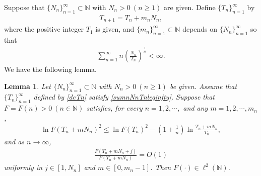 \documentclass[12pt]{amsart}
\theoremstyle{plain}
\newtheorem{lemma}[theorem]{Lemma}
\theoremstyle{definition}
\begin{document}
	Suppose that $\{N_n\}_{n=1}^\infty\subset\mathbb{N}$ with $N_n>0\ (n\geq 1)$ are given. Define $\{T_n\}_{n=1}^\infty$ by 
\begin{align}
T_{n+1}=T_n+m_nN_n,\label{deTn}
\end{align}
where the positive integer $T_1$ is given, and $\{m_n\}_{n=1}^\infty\subset \mathbb{N}$ depends on $\{N_n\}_{n=1}^{\infty}$ so that
\begin{align}
\sum_{n=1}^{\infty}n\left(\frac{N_n}{T_n}\right)^{\frac{1}{n}}<\infty.\label{sumnNnTnleqinfty}
\end{align}
We have the following lemma.
\begin{lemma}\label{lemmabasiccritical} Let $\{N_n\}_{n=1}^\infty\subset\mathbb{N}$ with $N_n>0\ (n\geq 1)$ be given. Assume that $\{T_n\}_{n=1}^\infty$ defined by \eqref{deTn} satisfy \eqref{sumnNnTnleqinfty}.
		Suppose that $F=F(n)>0\ (n\in\mathbb{N})$
satisfies, for every $n=1,2,\cdots,$ and  any $m=1,2,\cdots, {m}_{n}$, 
\begin{align}
\ln F(T_n+mN_n)^2\leq \ln F(T_n)^2-\left(1+\frac{1}{n}\right)\ln\frac{T_n+mN_n}{T_n},\label{crilnF}
\end{align}
and as $n\to\infty$,
\begin{align}
\frac{F(T_n+mN_n+j)}{F(T_n+mN_n)}=O(1)\label{criFTn}
\end{align}
uniformly in $j\in [1,N_n]$ and $m\in [0,m_n-1]$. Then $F(\cdot)\in\ell^2(\mathbb{N})$.
\end{lemma}
\end{document}
